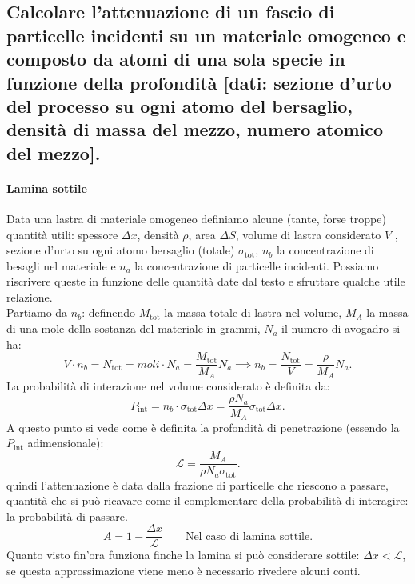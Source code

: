 \subsection[ Attenuazione di fascio di particelle su materiale omogeneo con atomi di una specie]{Calcolare l'attenuazione di un fascio di particelle incidenti su un materiale omogeneo e composto da atomi di una sola specie in funzione della profondità [dati: sezione d'urto del processo su ogni atomo del bersaglio, densità di massa del mezzo, numero atomico del mezzo].}
\label{sec:2.b.5}
\paragraph{Lamina sottile}
Data una lastra di materiale omogeneo definiamo alcune (tante, forse troppe) quantità utili: spessore $\Delta x$, densità $\rho$, area $\Delta S$, volume di lastra considerato $V$ , sezione d'urto su ogni atomo bersaglio (totale) $ \sigma_{\text{tot}}$, $n_b$ la concentrazione di besagli nel materiale e $n_a$ la concentrazione di particelle incidenti. Possiamo riscrivere queste in funzione delle quantità date dal testo e sfruttare qualche utile relazione.\\ 
Partiamo da $n_b$: definendo $M_{\text{tot}}$ la massa totale di lastra nel volume, $M_A$ la massa di una mole della sostanza del materiale in grammi, $N_a$ il numero di avogadro si ha:
\[
	V \cdot n_b = N_{\text{tot}} = moli\cdot N_a= \frac{M_{\text{tot}}}{M_A} N_a \implies n_b =\frac{N_{\text{tot}}}{V} = \frac{\rho}{M_A} N_a
.\]
La probabilità di interazione nel volume considerato è definita da:
\[
	P_{\text{int}} = n_b \cdot \sigma_{\text{tot}} \Delta x  = \frac{\rho N_a }{M_A} \sigma_{\text{tot}}\Delta x
.\] 
A questo punto si vede come è definita la profondità di penetrazione (essendo la $P_{\text{int}}$ adimensionale):
\[
	\mathcal{L} = \frac{M_A}{\rho N_a\sigma_{\text{tot}}}
.\] 
quindi l'attenuazione è data dalla frazione di particelle che riescono a passare, quantità che si può ricavare come il complementare della probabilità di interagire: la probabilità di passare.
\[
	A = 1 - \frac{\Delta x}{\mathcal{L}} \quad \quad 
	\text{Nel caso di lamina sottile}
.\] 
Quanto visto fin'ora funziona finche la lamina si può considerare sottile: $\Delta x < \mathcal{L}$, se questa approssimazione viene meno è necessario rivedere alcuni conti.
